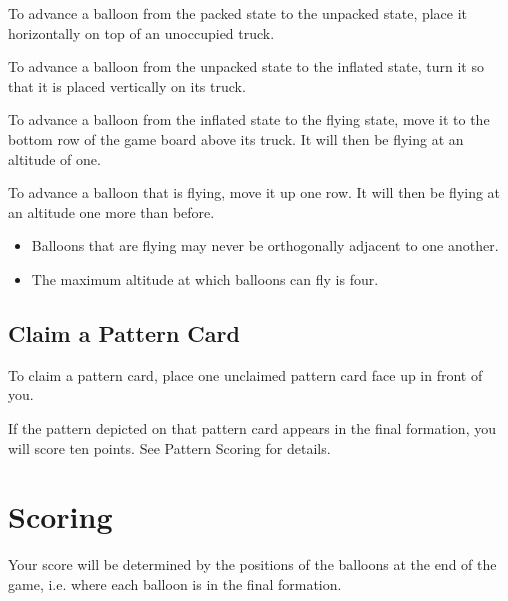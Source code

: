 \documentclass[a6paper, 11pt, parskip=half, DIV=15]{scrartcl}
\begin{document}
\begin{description}[leftmargin=0pt]
  \item[Unpack:] To advance a balloon from the packed state to the unpacked state, place it horizontally on top of an unoccupied  truck.
  \item[Inflate:] To advance a balloon from the unpacked state to the inflated state, turn it so that it is placed vertically on its truck.
  \item[Launch:] To advance a balloon from the inflated state to the flying state, move it to the bottom row of the game board above its truck. It will then be flying at an altitude of one.
  \item[Ascend:] To advance a balloon that is flying, move it up one row. It will then be flying at an altitude one more than before.
  \begin{itemize}
    \item Balloons that are flying may never be orthogonally adjacent to one another.%
    \item The maximum altitude at which balloons can fly is four.
  \end{itemize}
\end{description}

\newpage
\enlargethispage{1.75\baselineskip}
\subsection*{Claim a Pattern Card}

To claim a pattern card, place one unclaimed pattern card face up in front of you.

If the pattern depicted on that pattern card appears in the final formation, you will score ten points. See \textcolor{SunriseBlue}{\setmainfont{Fredoka-Bold}Pattern Scoring} for details.


\section*{Scoring}
Your score will be determined by the positions of the balloons at the end of the game, i.e. where each balloon is in the final formation.
\end{document}

